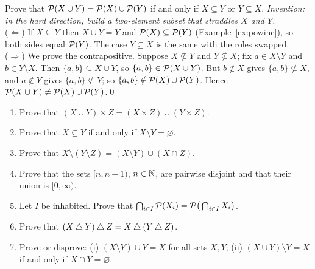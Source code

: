 \begin{bexample}
Prove that $\mathcal{P}(X\cup Y)=\mathcal{P}(X)\cup\mathcal{P}(Y)$ if and only if $X\subseteq Y$ or $Y\subseteq X$.
\solution
\emph{Invention: in the hard direction, build a two-element subset that straddles $X$ and $Y$.}\\
($\Leftarrow$) If $X\subseteq Y$ then $X\cup Y=Y$ and $\mathcal{P}(X)\subseteq\mathcal{P}(Y)$ (Example~\ref{ex:powinc}), so both sides equal $\mathcal{P}(Y)$. The case $Y\subseteq X$ is the same with the roles swapped.\\
($\Rightarrow$) We prove the contrapositive. Suppose $X\not\subseteq Y$ and $Y\not\subseteq X$; fix $a\in X\setminus Y$ and $b\in Y\setminus X$. Then $\{a,b\}\subseteq X\cup Y$, so $\{a,b\}\in\mathcal{P}(X\cup Y)$. But $b\notin X$ gives $\{a,b\}\not\subseteq X$, and $a\notin Y$ gives $\{a,b\}\not\subseteq Y$; so $\{a,b\}\notin\mathcal{P}(X)\cup\mathcal{P}(Y)$. Hence $\mathcal{P}(X\cup Y)\ne\mathcal{P}(X)\cup\mathcal{P}(Y)$.\qed
\end{bexample}

\begin{stretchbox}[2]
\begin{enumerate}[label=\textbf{S2.\arabic*}, leftmargin=3em]
\item Prove that $(X\cup Y)\times Z=(X\times Z)\cup(Y\times Z)$.
\item Prove that $X\subseteq Y$ if and only if $X\setminus Y=\varnothing$.
\item Prove that $X\setminus(Y\setminus Z)=(X\setminus Y)\cup(X\cap Z)$.
\item Prove that the sets $[n,n+1)$, $n\in\mathbb{N}$, are pairwise disjoint and that their union is $[0,\infty)$. 
\item Let $I$ be inhabited. Prove that $\bigcap_{i\in I}\mathcal{P}(X_i)=\mathcal{P}\big(\bigcap_{i\in I}X_i\big)$. 
\item Prove that $(X\mathbin{\triangle} Y)\mathbin{\triangle} Z=X\mathbin{\triangle}(Y\mathbin{\triangle} Z)$. 
\item Prove or disprove: (i) $(X\setminus Y)\cup Y=X$ for all sets $X,Y$; (ii) $(X\cup Y)\setminus Y=X$ if and only if $X\cap Y=\varnothing$.
\end{enumerate}
\end{stretchbox}
